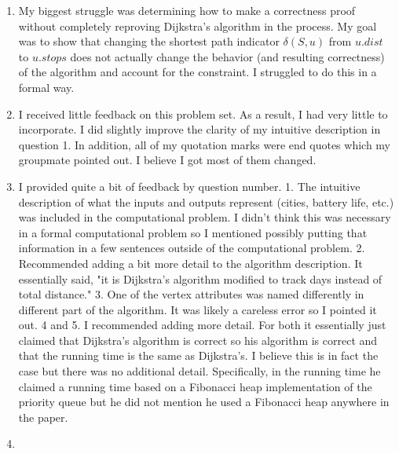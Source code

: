 \documentclass[11pt]{article}
\theoremstyle{nonumberplain}
\begin{document}
\begin{enumerate}
\item My biggest struggle was determining how to make a correctness proof without completely reproving Dijkstra's algorithm in the process. My goal was to show that changing the shortest path indicator $\delta(S,u)$ from $u.dist$ to $u.stops$ does not actually change the behavior (and resulting correctness) of the algorithm and account for the constraint. I struggled to do this in a formal way.
\item I received little feedback on this problem set. As a result, I had very little to incorporate. I did slightly improve the clarity of my intuitive description in question 1. In addition, all of my quotation marks were end quotes which my groupmate pointed out. I believe I got most of them changed.
\item I provided quite a bit of feedback by question number. 1. The intuitive description of what the inputs and outputs represent (cities, battery life, etc.) was included in the computational problem. I didn't think this was necessary in a formal computational problem so I mentioned possibly putting that information in a few sentences outside of the computational problem. 2. Recommended adding a bit more detail to the algorithm description. It essentially said, "it is Dijkstra's algorithm modified to track days instead of total distance." 3. One of the vertex attributes was named differently in different part of the algorithm. It was likely a careless error so I pointed it out. 4 and 5. I recommended adding more detail. For both it essentially just claimed that Dijkstra's algorithm is correct so his algorithm is correct and that the running time is the same as Dijkstra's. I believe this is in fact the case but there was no additional detail. Specifically, in the running time he claimed a running time based on a Fibonacci heap implementation of the priority queue but he did not mention he used a Fibonacci heap anywhere in the paper.   
\item
  \begin{itemize}

\end{itemize}
\end{enumerate}
\end{document}
